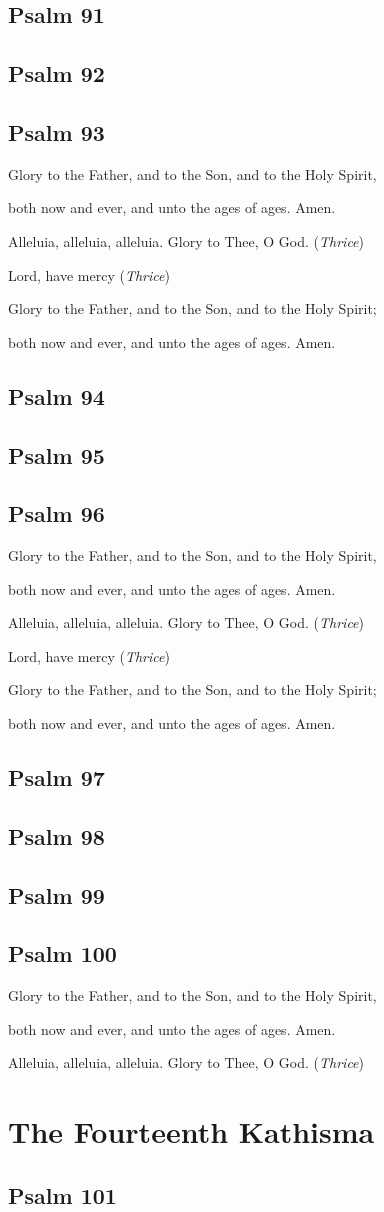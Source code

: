 \documentclass[12pt,openany]{book}
\newcommand{\kathismabreak}{
  \medskip
  \begin{center}
  \begin{footnotesize}
  Glory to the Father, and to the Son, and to the Holy Spirit,
  
  both now and ever, and unto the ages of ages. Amen.

  Alleluia, alleluia, alleluia. Glory to Thee, O God. (\textit{Thrice})

  Lord, have mercy (\textit{Thrice})

  Glory to the Father, and to the Son, and to the Holy Spirit;
  
  both now and ever, and unto the ages of ages. Amen.
  \end{footnotesize}
  \end{center}
  \smallbreak
}
\newcommand{\kathismaend}{
  \medskip
  \begin{center}
  \begin{footnotesize}
  Glory to the Father, and to the Son, and to the Holy Spirit,
  
  both now and ever, and unto the ages of ages. Amen.

  Alleluia, alleluia, alleluia. Glory to Thee, O God. (\textit{Thrice})
  \end{footnotesize}
  \end{center}
  \smallbreak
}
\begin{document}
\section{Psalm 91}

\smallskip
\section{Psalm 92}

\smallskip
\section{Psalm 93}


\kathismabreak
\smallskip
\section{Psalm 94}

\smallskip
\section{Psalm 95}

\smallskip
\section{Psalm 96}


\kathismabreak
\smallskip
\section{Psalm 97}

\smallskip
\section{Psalm 98}

\smallskip
\section{Psalm 99}

\smallskip
\section{Psalm 100}


\kathismaend

\chapter*{The Fourteenth Kathisma}
\smallskip
\section{Psalm 101}

\smallskip
\end{document}
